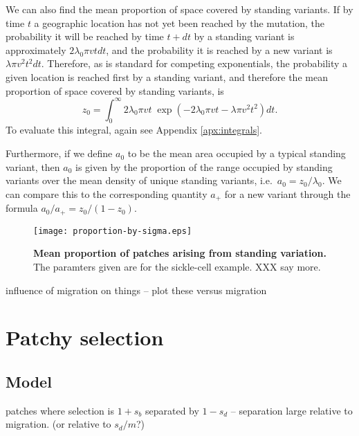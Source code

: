 \documentclass{article}
\begin{document}
We can also find the mean proportion of space covered by standing variants.
If by time $t$ a geographic location has not yet been reached by the mutation,
the probability it will be reached by time $t+dt$ 
by a standing variant is approximately $2 \lambda_0 \pi vt dt$, 
and the probability it is reached by a new variant is $\lambda \pi v^2 t^2 dt$.
Therefore, as is standard for competing exponentials,
the probability a given location is reached first by a standing variant,
and therefore the mean proportion of space covered  by standing variants,
is
\begin{equation}
    z_0 = \int_0^\infty {2 \lambda_0 \pi v t} \; \exp \left( - 2 \lambda_0 \pi v t - \lambda \pi v^2 t^2 \right) dt .
\end{equation}
To evaluate this integral, again see Appendix \ref{apx:integrals}.

Furthermore, if we define $a_0$ to be the mean area occupied by a typical standing variant, 
then $a_0$ is given by the proportion of the range occupied by standing variants over the mean density of unique standing variants,
i.e.\ $a_0 = z_0 / \lambda_0$.
We can compare this to the corresponding quantity $a_+$ for a new variant through the formula
$a_0 / a_+ = z_0 / (1-z_0)$.

\begin{figure}[ht]
\begin{center}
\texttt{[image: proportion-by-sigma.eps]}
\caption{ %
{\bf Mean proportion of patches arising from standing variation.} The paramters given are for the sickle-cell example.  XXX say more.
}
\label{fig:cartoon}
\end{center}

\end{figure}


influence of migration on things -- plot these versus migration 


\section{Patchy selection} 

\subsection{Model} 

patches where selection is $1+s_b$ separated by $1-s_d$ -- separation large relative to migration.   
(or relative to $s_d/m$?) 
\end{document}
